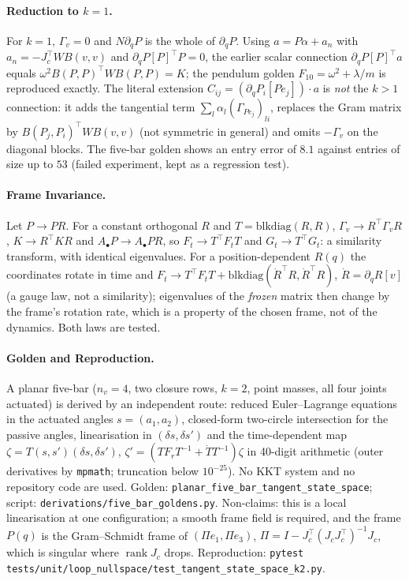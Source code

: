 \documentclass[11pt,a4paper]{article}
\begin{document}
\paragraph{Reduction to $k=1$.}  For $k=1$, $\Gamma_v=0$ and $N\partial_qP$
is the whole of $\partial_qP$.  Using $a=P\alpha+a_n$ with
$a_n=-J_c^{\!\top}WB(v,v)$ and $\partial_qP[P]^{\!\top}P=0$, the earlier
scalar connection $\partial_qP[P]^{\!\top}a$ equals
$\omega^2B(P,P)^{\!\top}WB(P,P)=K$; the pendulum golden
$F_{10}=\omega^2+\lambda/m$ is reproduced exactly.  The literal extension
$C_{ij}=(\partial_qP_i[Pe_j])\cdot a$ is \emph{not} the $k>1$ connection: it
adds the tangential term $\sum_l\alpha_l(\Gamma_{Pe_j})_{li}$, replaces the
Gram matrix by $B(P_j,P_i)^{\!\top}WB(v,v)$ (not symmetric in general) and
omits $-\Gamma_v$ on the diagonal blocks.  The five-bar golden shows an
entry error of $8.1$ against entries of size up to $53$ (failed experiment,
kept as a regression test).

\paragraph{Frame Invariance.}  Let $P\to PR$.  For a constant orthogonal $R$
and $T=\mathrm{blkdiag}(R,R)$, $\Gamma_v\to R^{\!\top}\Gamma_vR$,
$K\to R^{\!\top}KR$ and $A_\bullet P\to A_\bullet PR$, so
$F_t\to T^{\!\top}F_tT$ and $G_t\to T^{\!\top}G_t$: a similarity transform,
with identical eigenvalues.  For a position-dependent $R(q)$ the coordinates
rotate in time and
$F_t\to T^{\!\top}F_tT+\mathrm{blkdiag}(\dot R^{\!\top}R,\dot R^{\!\top}R)$,
$\dot R=\partial_qR[v]$ (a gauge law, not a similarity); eigenvalues of the
\emph{frozen} matrix then change by the frame's rotation rate, which is a
property of the chosen frame, not of the dynamics.  Both laws are tested.

\paragraph{Golden and Reproduction.}  A planar five-bar ($n_v=4$, two closure
rows, $k=2$, point masses, all four joints actuated) is derived by an
independent route: reduced Euler--Lagrange equations in the actuated angles
$s=(a_1,a_2)$, closed-form two-circle intersection for the passive angles,
linearisation in $(\delta s,\delta s')$ and the time-dependent map
$\zeta=T(s,s')(\delta s,\delta s')$, $\zeta'=(TF_rT^{-1}+\dot TT^{-1})\zeta$ in
40-digit arithmetic (outer derivatives by \texttt{mpmath}; truncation below
$10^{-25}$).  No KKT system and no repository code are used.  Golden:
\texttt{planar\_five\_bar\_tangent\_state\_space}; script:
\texttt{derivations/five\_bar\_goldens.py}.  Non-claims: this is a local
linearisation at one configuration; a smooth frame field is required, and
the frame $P(q)$ is the Gram--Schmidt frame of
$(\Pi e_1,\Pi e_3)$, $\Pi=I-J_c^{\!\top}(J_cJ_c^{\!\top})^{-1}J_c$, which is
singular where $\operatorname{rank}J_c$ drops.  Reproduction:
\texttt{pytest tests/unit/loop\_nullspace/test\_tangent\_state\_space\_k2.py}.
\end{document}
